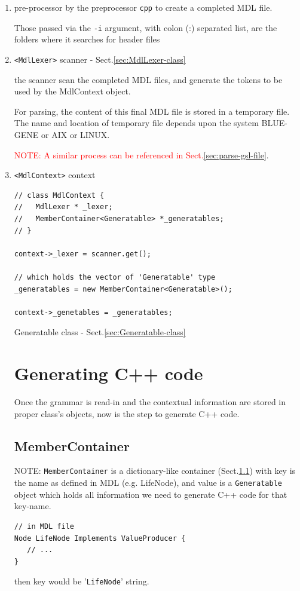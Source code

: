 \begin{enumerate}
  \item pre-processor by the preprocessor \verb!cpp! to create a completed MDL file.
  
Those passed via the \verb!-i! argument, with colon (:) separated list, are the folders where it searches for header files  
  
  \item \verb!<MdlLexer>! scanner - Sect.\ref{sec:MdlLexer-class}
  
the scanner scan the completed MDL files, and generate the tokens to be used by the MdlContext object.

For parsing, the content of this final MDL file is stored in a temporary file.
The name and location of temporary file depends upon the system BLUE-GENE or AIX
or LINUX. 

\textcolor{red}{NOTE: A similar process can be referenced in Sect.\ref{sec:parse-gsl-file}}.

  \item \verb!<MdlContext>! context
  
\begin{verbatim}
// class MdlContext {
//   MdlLexer * _lexer;
//   MemberContainer<Generatable> *_generatables;
// }

context->_lexer = scanner.get();

// which holds the vector of 'Generatable' type
_generatables = new MemberContainer<Generatable>();

context->_genetables = _generatables;

\end{verbatim}  
Generatable class - Sect.\ref{sec:Generatable-class}

\section{Generating C++ code}

Once the grammar is read-in and the contextual information are stored in proper
class's objects, now is the step to generate C++ code.

\subsection{MemberContainer}
\label{sec:MemberContainer}

NOTE: \verb!MemberContainer! is a dictionary-like container
(Sect.\ref{sec:MemberContainer}) with key is the name as defined in MDL (e.g.
LifeNode), and value is a \verb!Generatable! object which holds all information
we need to generate C++ code for that key-name.
\begin{verbatim}
// in MDL file
Node LifeNode Implements ValueProducer {
   // ...
}
\end{verbatim}
then key would be '\verb!LifeNode!' string.


\end{enumerate}

